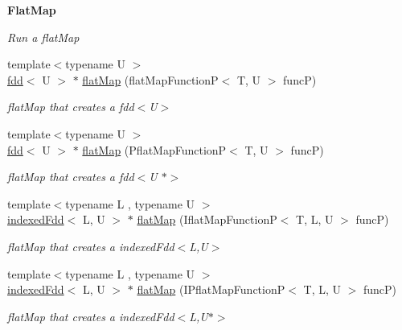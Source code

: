\begin{Indent}{\bf Flat\+Map}\par
{\em Run a flat\+Map }\begin{DoxyCompactItemize}
\item 
\hypertarget{classfaster_1_1fdd_a7efd43be1d3005d654c4656d521faf30}{}\label{classfaster_1_1fdd_a7efd43be1d3005d654c4656d521faf30} 
{\footnotesize template$<$typename U $>$ }\\\hyperlink{classfaster_1_1fdd}{fdd}$<$ U $>$ $\ast$ \hyperlink{classfaster_1_1fdd_a7efd43be1d3005d654c4656d521faf30}{flat\+Map} (flat\+Map\+FunctionP$<$ T, U $>$ funcP)
\begin{DoxyCompactList}\small\item\em flat\+Map that creates a fdd$<$\+U$>$ \end{DoxyCompactList}\item 
\hypertarget{classfaster_1_1fdd_a3f353414307512c23d88fc3e8b2e8221}{}\label{classfaster_1_1fdd_a3f353414307512c23d88fc3e8b2e8221} 
{\footnotesize template$<$typename U $>$ }\\\hyperlink{classfaster_1_1fdd}{fdd}$<$ U $>$ $\ast$ \hyperlink{classfaster_1_1fdd_a3f353414307512c23d88fc3e8b2e8221}{flat\+Map} (Pflat\+Map\+FunctionP$<$ T, U $>$ funcP)
\begin{DoxyCompactList}\small\item\em flat\+Map that creates a fdd$<$\+U $\ast$$>$ \end{DoxyCompactList}\item 
\hypertarget{classfaster_1_1fdd_a499a1c3638cc1e95e483cd91c7a884a7}{}\label{classfaster_1_1fdd_a499a1c3638cc1e95e483cd91c7a884a7} 
{\footnotesize template$<$typename L , typename U $>$ }\\\hyperlink{classfaster_1_1indexedFdd}{indexed\+Fdd}$<$ L, U $>$ $\ast$ \hyperlink{classfaster_1_1fdd_a499a1c3638cc1e95e483cd91c7a884a7}{flat\+Map} (Iflat\+Map\+FunctionP$<$ T, L, U $>$ funcP)
\begin{DoxyCompactList}\small\item\em flat\+Map that creates a indexed\+Fdd$<$\+L,\+U$>$ \end{DoxyCompactList}\item 
\hypertarget{classfaster_1_1fdd_ab1c639e6fe55d66ac0cb50011d537567}{}\label{classfaster_1_1fdd_ab1c639e6fe55d66ac0cb50011d537567} 
{\footnotesize template$<$typename L , typename U $>$ }\\\hyperlink{classfaster_1_1indexedFdd}{indexed\+Fdd}$<$ L, U $>$ $\ast$ \hyperlink{classfaster_1_1fdd_ab1c639e6fe55d66ac0cb50011d537567}{flat\+Map} (I\+Pflat\+Map\+FunctionP$<$ T, L, U $>$ funcP)
\begin{DoxyCompactList}\small\item\em flat\+Map that creates a indexed\+Fdd$<$\+L,\+U$\ast$$>$ \end{DoxyCompactList}\end{DoxyCompactItemize}
\end{Indent}
